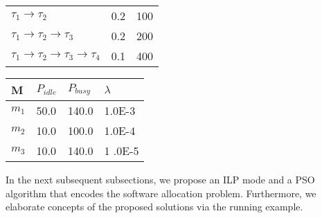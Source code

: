 \begin{center}
\begin{minipage}{.45\textwidth}
\begin{center}
\begin{tabular}{@{}lll@{}}
    $\tau_1\rightarrow\tau_2$ & 0.2  & 100\\
    $\tau_1\rightarrow\tau_2\rightarrow\tau_3$ & 0.2  & 200\\
    $\tau_1\rightarrow\tau_2\rightarrow\tau_3\rightarrow\tau_4$ & 0.1  & 400\\
    \bottomrule
    \end{tabular}
    \label{tbl_requirements}
\end{center}
\begin{center}
    \begin{tabular}{@{}llll@{}}
    \toprule
    M  & $P_{idle}$& $P_{busy}$& $\lambda$ \\ \midrule
    $m_1$ & 50.0& 140.0 &1.0E-3  \\
    $m_2$ & 10.0& 100.0 &1.0E-4  \\
    $m_3$ & 10.0& 140.0 &1 .0E-5 \\ \bottomrule
    \end{tabular}
    \label{tbl_nodes_specification}
\end{center}
\end{minipage}
\end{center}

In the next subsequent subsections, we propose an ILP mode and a PSO algorithm that encodes the software allocation problem. Furthermore, we elaborate concepts of the proposed solutions via the running example.
